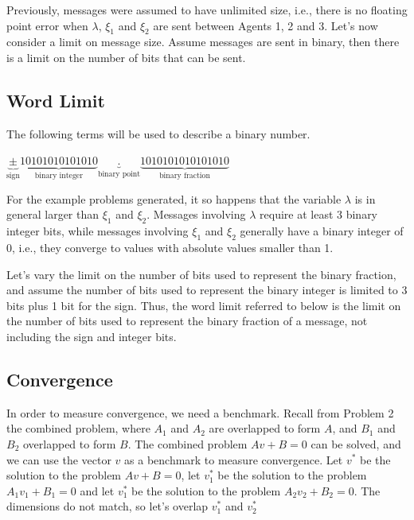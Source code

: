 \documentclass[12pt]{article}
\begin{document}
Previously, messages were assumed to have unlimited size, i.e., there is no floating point error when $\lambda$, $\xi_1$ and $\xi_2$ are sent between Agents 1, 2 and 3. Let's now consider a limit on message size. Assume messages are sent in binary, then there is a limit on the number of bits that can be sent.

\subsection*{Word Limit}

The following terms will be used to describe a binary number.
\begin{center}
	$\underbrace{\pm}_{\text{sign}}\underbrace{10101010101010}_{\text{binary integer}}\underbrace{.}_{\text{binary point}}\underbrace{1010101010101010}_{\text{binary fraction}}$
\end{center}


For the example problems generated, it so happens that the variable $\lambda$ is in general larger than $\xi_1$ and $\xi_2$. Messages involving $\lambda$ require at least 3 binary integer bits, while messages involving $\xi_1$ and $\xi_2$ generally have a binary integer of 0, i.e., they converge to values with absolute values smaller than 1.

Let's vary the limit on the number of bits used to represent the binary fraction, and assume the number of bits used to represent the binary integer is limited to 3 bits plus 1 bit for the sign. Thus, the word limit referred to below is the limit on the number of bits used to represent the binary fraction of a message, not including the sign and integer bits.

\subsection*{Convergence}

In order to measure convergence, we need a benchmark. Recall from Problem 2 the combined problem, where $A_1$ and $A_2$ are overlapped to form $A$, and $B_1$ and $B_2$ overlapped to form $B$. The combined problem $Av+B=0$ can be solved, and we can use the vector $v$ as a benchmark to measure convergence. Let $v^*$ be the solution to the problem $Av+B=0$, let $v_1^*$ be the solution to the problem $A_1v_1+B_1=0$ and let $v_1^*$ be the solution to the problem $A_2v_2+B_2=0$. The dimensions do not match, so let's overlap $v_1^*$ and $v_2^*$
\end{document}
